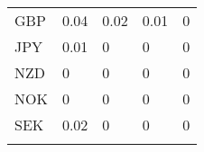 \begin{table}[H]
\begin{tabular}{lllll}
GBP & \cellcolor[HTML]{F5FAF9}0.04 & \cellcolor[HTML]{F9FBFC}0.02 & \cellcolor[HTML]{FBFCFE}0.01 & \cellcolor[HTML]{FCFCFF}0 \\
JPY & \cellcolor[HTML]{FBFCFE}0.01 & \cellcolor[HTML]{FCFCFF}0 & \cellcolor[HTML]{FCFCFF}0 & \cellcolor[HTML]{FCFCFF}0 \\
NZD & \cellcolor[HTML]{FCFCFF}0 & \cellcolor[HTML]{FCFCFF}0 & \cellcolor[HTML]{FCFCFF}0 & \cellcolor[HTML]{FCFCFF}0 \\
NOK & \cellcolor[HTML]{FCFCFF}0 & \cellcolor[HTML]{FCFCFF}0 & \cellcolor[HTML]{FCFCFF}0 & \cellcolor[HTML]{FCFCFF}0 \\
SEK & \cellcolor[HTML]{F9FBFC}0.02 & \cellcolor[HTML]{FCFCFF}0 & \cellcolor[HTML]{FCFCFF}0 & \cellcolor[HTML]{FCFCFF}0 \\
\hline \\[-1.8ex] 
\end{tabular}
\end{table}

